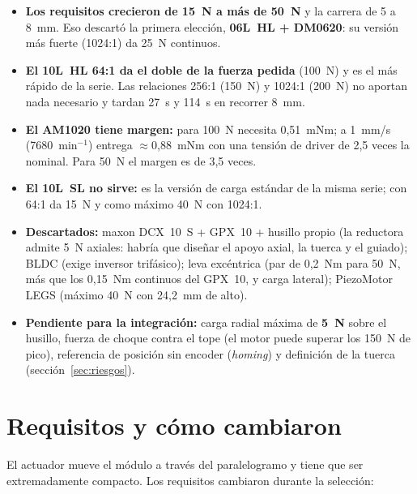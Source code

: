 \documentclass[11pt,a4paper]{article}
\begin{document}
\begin{itemize}
  \item \textbf{Los requisitos crecieron de 15~N a más de 50~N} y la carrera de 5 a 8~mm. Eso descartó la
        primera elección, \textbf{06L~HL + DM0620}: su versión más fuerte (1024:1) da 25~N continuos.
  \item \textbf{El 10L~HL 64:1 da el doble de la fuerza pedida} (100~N) y es el más rápido de la serie.
        Las relaciones 256:1 (150~N) y 1024:1 (200~N) no aportan nada necesario y tardan 27~s y 114~s en
        recorrer 8~mm.
  \item \textbf{El AM1020 tiene margen:} para 100~N necesita 0,51~mNm; a 1~mm/s (7680~min$^{-1}$) entrega
        $\approx$0,88~mNm con una tensión de driver de 2,5 veces la nominal. Para 50~N el margen es de 3,5 veces.
  \item \textbf{El 10L~SL no sirve:} es la versión de carga estándar de la misma serie; con 64:1 da 15~N y
        como máximo 40~N con 1024:1.
  \item \textbf{Descartados:} maxon DCX~10~S + GPX~10 + husillo propio (la reductora admite 5~N axiales:
        habría que diseñar el apoyo axial, la tuerca y el guiado); BLDC (exige inversor trifásico); leva
        excéntrica (par de 0,2~Nm para 50~N, más que los 0,15~Nm continuos del GPX~10, y carga lateral);
        PiezoMotor LEGS (máximo 40~N con 24,2~mm de alto).
  \item \textbf{Pendiente para la integración:} carga radial máxima de \textbf{5~N} sobre el husillo, fuerza
        de choque contra el tope (el motor puede superar los 150~N de pico), referencia de posición sin
        encoder (\emph{homing}) y definición de la tuerca (sección~\ref{sec:riesgos}).
\end{itemize}

\section{Requisitos y cómo cambiaron}
El actuador mueve el módulo a través del paralelogramo y tiene que ser extremadamente compacto. Los
requisitos cambiaron durante la selección:
\end{document}

